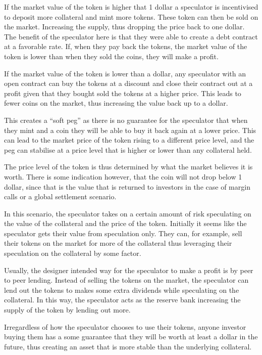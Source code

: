 \documentclass[english,]{IEEEtran}
\begin{document}
If the market value of the token is higher that 1 dollar a speculator is
incentivised to deposit more collateral and mint more tokens. These
token can then be sold on the market. Increasing the supply, thus
dropping the price back to one dollar. The benefit of the speculator
here is that they were able to create a debt contract at a favorable
rate. If, when they pay back the tokens, the market value of the token
is lower than when they sold the coins, they will make a profit.

If the market value of the token is lower than a dollar, any speculator
with an open contract can buy the tokens at a discount and close their
contract out at a profit given that they bought sold the tokens at a
higher price. This leads to fewer coins on the market, thus increasing
the value back up to a dollar.

This creates a ``soft peg'' as there is no guarantee for the speculator
that when they mint and a coin they will be able to buy it back again at
a lower price. This can lead to the market price of the token rising to
a different price level, and the peg can stabilise at a price level that
is higher or lower than any collateral held.

The price level of the token is thus determined by what the market
believes it is worth. There is some indication however, that the coin
will not drop below 1 dollar, since that is the value that is returned
to investors in the case of margin calls or a global settlement
scenario.

In this scenario, the speculator takes on a certain amount of risk
speculating on the value of the collateral and the price of the token.
Initially it seems like the speculator gets their value from speculation
only. They can, for example, sell their tokens on the market for more of
the collateral thus leveraging their speculation on the collateral by
some factor.

Usually, the designer intended way for the speculator to make a profit
is by peer to peer lending. Instead of selling the tokens on the market,
the speculator can lend out the tokens to makes some extra dividends
while speculating on the collateral. In this way, the speculator acts as
the reserve bank increasing the supply of the token by lending out more.

Irregardless of how the speculator chooses to use their tokens, anyone
investor buying them has a some guarantee that they will be worth at
least a dollar in the future, thus creating an asset that is more stable
than the underlying collateral.
\end{document}
